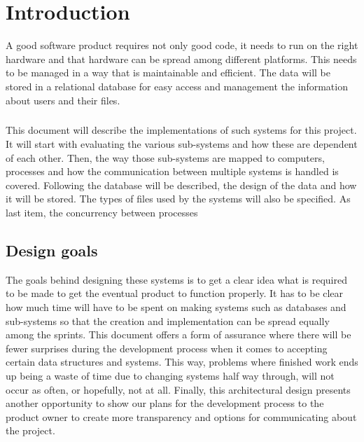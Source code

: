 \chapter{Introduction}
A good software product requires not only good code, it needs to run on the right hardware and that hardware can be spread among different platforms. This needs to be managed in a way that is maintainable and efficient. The data will be stored in a relational database for easy access and management the information about users and their files.
\paragraph{}
This document will describe the implementations of such systems for this project. It will start with evaluating the various sub-systems and how these are dependent of each other. Then, the way those sub-systems are mapped to computers, processes and how the communication between multiple systems is handled is covered. 
Following the database will be described, the design of the data and how it will be stored. The types of files used by the systems will also be specified. 
As last item, the concurrency between processes 
\section{Design goals}
The goals behind designing these systems is to get a clear idea what is required to be made to get the eventual product to function properly. It has to be clear how much time will have to be spent on making systems such as databases and sub-systems so that the creation and implementation can be spread equally among the sprints. This document offers a form of assurance where there will be fewer surprises during the development process when it comes to accepting certain data structures and systems. This way, problems where finished work ends up being a waste of time due to changing systems half way through, will not occur as often, or hopefully, not at all.
Finally, this architectural design presents another opportunity to show our plans for the development process to the product owner to create more transparency and options for communicating about the project.


